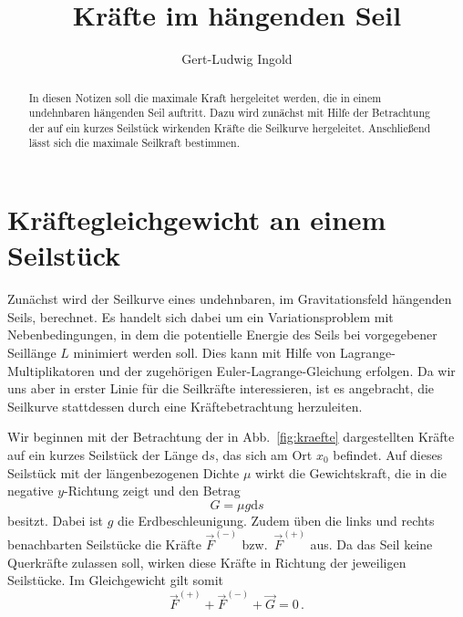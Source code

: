\documentclass[twocolumn,aps]{revtex4}
\begin{document}
\title{Kräfte im hängenden Seil}
\author{Gert-Ludwig Ingold}
\begin{abstract}
 In diesen Notizen soll die maximale Kraft hergeleitet werden, die in
 einem undehnbaren hängenden Seil auftritt. Dazu wird zunächst
 mit Hilfe der Betrachtung der auf ein kurzes Seilstück
 wirkenden Kräfte die Seilkurve hergeleitet. Anschließend lässt sich die
 maximale Seilkraft bestimmen.
\end{abstract}
\maketitle

\section{Kräftegleichgewicht an einem Seilstück}
Zunächst wird der Seilkurve eines undehnbaren, im Gravitationsfeld
hängenden Seils, berechnet. Es handelt sich dabei um ein
Variationsproblem mit Nebenbedingungen, in dem die potentielle Energie
des Seils bei vorgegebener Seillänge $L$ minimiert werden soll. Dies
kann mit Hilfe von Lagrange-Multiplikatoren und der zugehörigen
Euler-Lagrange-Gleichung erfolgen.  Da wir uns aber in erster Linie
für die Seilkräfte interessieren, ist es angebracht, die Seilkurve
stattdessen durch eine Kräftebetrachtung herzuleiten.

Wir beginnen mit der Betrachtung der in Abb.~\ref{fig:kraefte}
dargestellten Kräfte auf ein kurzes Seilstück der Länge $\mathrm{d}s$,
das sich am Ort $x_0$ befindet. Auf dieses Seilstück mit der
längenbezogenen Dichte $\mu$ wirkt die Gewichtskraft, die in die
negative $y$-Richtung zeigt und den Betrag
\begin{equation}
 G = \mu g\mathrm{d}s
\end{equation}
besitzt. Dabei ist $g$ die Erdbeschleunigung. Zudem üben die links und
rechts benachbarten Seilstücke die Kräfte $\vec F^{(-)}$ bzw.\ $\vec
F^{(+)}$ aus. Da das Seil keine Querkräfte zulassen soll, wirken diese
Kräfte in Richtung der jeweiligen Seilstücke. Im Gleichgewicht gilt
somit
\begin{equation}
 \vec F^{(+)}+\vec F^{(-)}+\vec G = 0\,.
 \label{eq:kraftgleichgewicht}
\end{equation}
\end{document}
